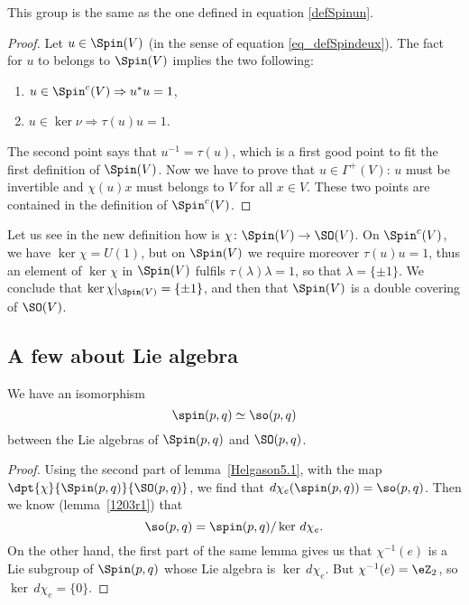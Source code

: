 \begin{lemma}
This group is the same as the one defined in equation \eqref{defSpinun}.
\end{lemma}

\begin{proof}
Let $u\in\Spin(V)$ (in the sense of equation \eqref{eq_defSpindeux}). The fact for $u$ to belongs to $\Spin(V)$ implies the two following:
\begin{enumerate}
\item $u\in\Spin^{c}(V)\Rightarrow u^*u=1$,
\item $u\in\ker\nu\Rightarrow \tau(u)u=1$.
\end{enumerate}
The second point says that $u^{-1}=\tau(u)$, which is a first good point to fit the first definition of $\Spin(V)$. Now we have to prove that $u\in\Gamma^{+}(V)$: $u$ must be invertible and $\chi(u)x$ must belongs to $V$ for all $x\in V$. These two points are contained in the definition of $\Spin^{c}(V)$.
\end{proof}
Let us see in the new definition how is $\chi\colon \Spin(V)\to \SO(V)$. On $\Spin^{c}(V)$, we have $\ker\chi=U(1)$, but on $\Spin(V)$ we require moreover $\tau(u)u=1$, thus an element of $\ker\chi$ in $\Spin(V)$ fulfils $\tau(\lambda)\lambda=1$, so that $\lambda=\{ \pm1 \}$. We conclude that $\ker\chi|_{\Spin(V)}=\{ \pm 1 \}$, and then that $\Spin(V)$ is a double covering of $\SO(V)$.


\subsection{A few about Lie algebra}

\begin{proposition}
We have an isomorphism
\[
                    \spin(p,q)\simeq\so(p,q)
\]
between the Lie algebras of $\Spin(p,q)$ and $\SO(p,q)$.
\label{prop:spin_so}
\end{proposition}

\begin{proof}
Using the second part of lemma~\ref{Helgason5.1}, with the map $\dpt{\chi}{\Spin(p,q)}{\SO(p,q)}$, we find that $d\chi_e(\spin(p,q))=\so(p,q)$. Then we know (lemma~\ref{1203r1}) that
\[
	\so(p,q)=\spin(p,q)/\ker\,d\chi_e.
\]
On the other hand, the first part of the same lemma gives us that $\chi^{-1}(e)$ is a Lie subgroup of $\Spin(p,q)$ whose Lie algebra is $\ker\,d\chi_e$. But $\chi^{-1}(e)=\eZ_2$, so $\ker\,d\chi_e=\{0\}$.
\end{proof}


